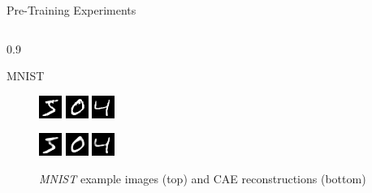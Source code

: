 \documentclass[final]{beamer}
\newlength{\onecolwid}
\newlength{\threecolwid}
\begin{document}
\begin{frame}[t]
\begin{columns}[t]
\begin{column}{\threecolwid}
\begin{alertblock}{Pre-Training Experiments}
\begin{columns}[t, totalwidth=0.9\threecolwid]
\begin{column}{0.9\onecolwid}
\begin{block}{MNIST}
\begin{figure}
\centering
\includegraphics[width=0.2\linewidth]{graphics/reconstructions/mnist/input_00.png}
\includegraphics[width=0.2\linewidth]{graphics/reconstructions/mnist/input_01.png}
\includegraphics[width=0.2\linewidth]{graphics/reconstructions/mnist/input_02.png}

\includegraphics[width=0.2\linewidth]{graphics/reconstructions/mnist/reconstruction_00.png}
\includegraphics[width=0.2\linewidth]{graphics/reconstructions/mnist/reconstruction_01.png}
\includegraphics[width=0.2\linewidth]{graphics/reconstructions/mnist/reconstruction_02.png}

\caption{\emph{MNIST} example images (top) and CAE reconstructions (bottom)}

\end{figure}


\end{block}
\end{column}
\end{columns}
\end{alertblock}
\end{column}
\end{columns}
\end{frame}
\end{document}

